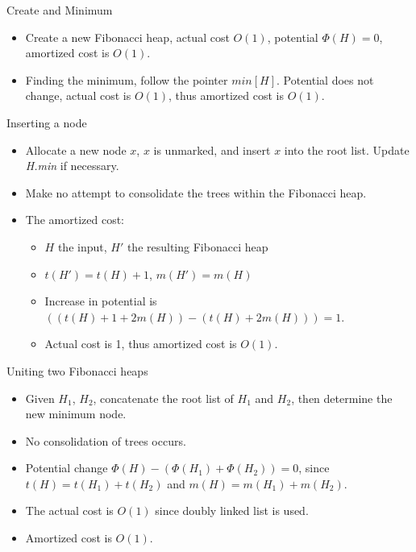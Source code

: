 \documentclass{beamer}
\begin{document}

\begin{frame}{{\sc Create} and {\sc Minimum}}
\vspace{0.5cm}
\begin{itemize}
\item Create a new Fibonacci heap, actual cost $O(1)$, potential $\Phi(H)=0$, amortized cost is $O(1)$. 
\item Finding the minimum, follow the pointer $min[H]$. Potential does not change, actual cost is $O(1)$,
thus amortized cost is $O(1)$. 
\end{itemize}
\end{frame}

\begin{frame}{Inserting a node}
\begin{itemize}
\item Allocate a new node $x$, $x$ is unmarked, and insert $x$ into the root list.
 Update {\it H.min} if necessary. 
\item Make no attempt to consolidate the trees within the Fibonacci heap. 
\item The amortized cost: 
\begin{itemize}
 \item $H$ the input, $H'$ the resulting Fibonacci heap
 \item $t(H')=t(H)+1$, $m(H')=m(H)$
 \item Increase in potential is $((t(H)+1+2m(H))-(t(H)+2m(H)))=1$.
 \item Actual cost is 1, thus amortized cost is $O(1)$. 
\end{itemize}
\end{itemize}
\end{frame}

\begin{frame}{Uniting two Fibonacci heaps}
\begin{itemize}
\item Given $H_1$, $H_2$, concatenate the root list of $H_1$ and $H_2$,
 then determine the new minimum node.
\item No consolidation of trees occurs.
\item Potential change $\Phi(H)-(\Phi(H_1)+\Phi(H_2)) =0$, since $t(H)=t(H_1)+t(H_2)$
 and $m(H)=m(H_1)+m(H_2)$. 
\item The actual cost is $O(1)$ since doubly linked list is used. 
\item Amortized cost is $O(1)$. 
\end{itemize}
\end{frame}
\end{document}
